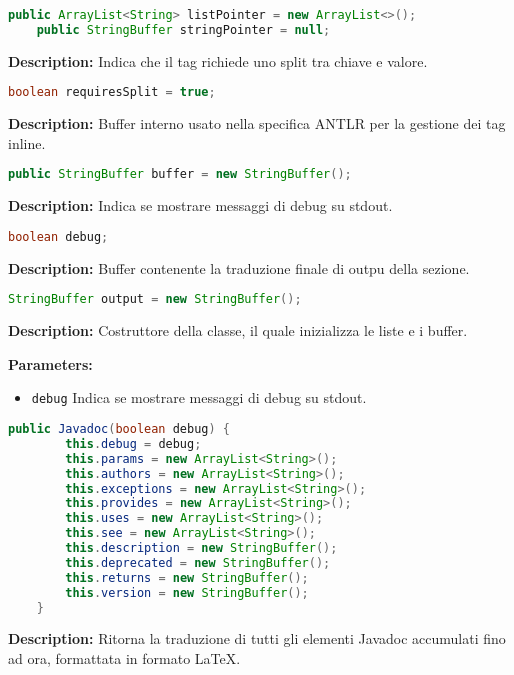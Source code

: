 \begin{lstlisting}[language=Java]
    public ArrayList<String> listPointer = new ArrayList<>();
    public StringBuffer stringPointer = null;
\end{lstlisting}
\textbf{Description:} Indica che il tag richiede uno split tra chiave e valore.

\begin{lstlisting}[language=Java]
    boolean requiresSplit = true;
\end{lstlisting}
\textbf{Description:} Buffer interno usato nella specifica ANTLR per la gestione dei tag inline.

\begin{lstlisting}[language=Java]
    public StringBuffer buffer = new StringBuffer();
\end{lstlisting}
\textbf{Description:} Indica se mostrare messaggi di debug su stdout.

\begin{lstlisting}[language=Java]
    boolean debug;
\end{lstlisting}
\textbf{Description:} Buffer contenente la traduzione finale di outpu della sezione.

\begin{lstlisting}[language=Java]
    StringBuffer output = new StringBuffer();
\end{lstlisting}
\textbf{Description:}  Costruttore della classe, il quale inizializza le liste e i buffer.  

\textbf{Parameters:}
\begin{itemize}
  \item\texttt{debug} Indica se mostrare messaggi di debug su stdout.
\end{itemize}

\begin{lstlisting}[language=Java]
    public Javadoc(boolean debug) {
        this.debug = debug;
        this.params = new ArrayList<String>();
        this.authors = new ArrayList<String>();
        this.exceptions = new ArrayList<String>();
        this.provides = new ArrayList<String>();
        this.uses = new ArrayList<String>();
        this.see = new ArrayList<String>();
        this.description = new StringBuffer();
        this.deprecated = new StringBuffer();
        this.returns = new StringBuffer();
        this.version = new StringBuffer();
    }
\end{lstlisting}
\textbf{Description:}  Ritorna la traduzione di tutti gli elementi Javadoc accumulati fino ad ora, formattata in formato LaTeX.  

